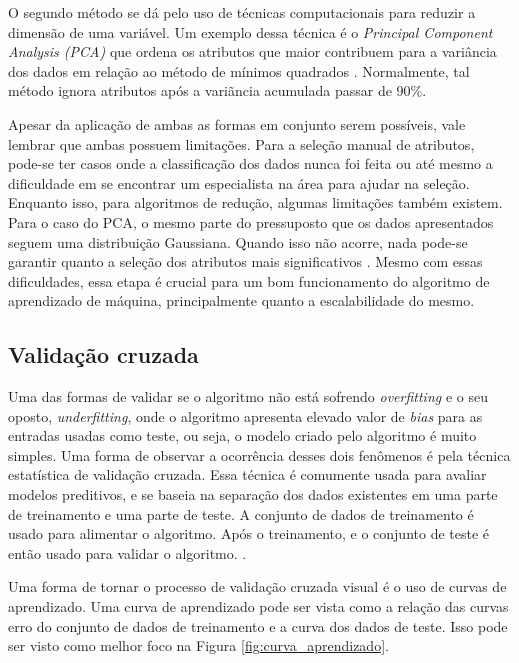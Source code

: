 O segundo método se dá pelo uso de técnicas computacionais para reduzir a
dimensão de uma variável. Um exemplo dessa técnica é o \textit{Principal
Component Analysis (PCA) } que ordena os atributos que maior contribuem para a
variância dos dados em relação ao método de mínimos quadrados
\cite{amatriain2011data}. Normalmente, tal método ignora atributos após a
variãncia acumulada passar de 90\%.

Apesar da aplicação de ambas as formas em conjunto serem possíveis, vale lembrar
que ambas possuem limitações. Para a seleção manual de atributos, pode-se ter
casos onde a classificação dos dados nunca foi feita ou até mesmo a dificuldade
em se encontrar um especialista na área para ajudar na seleção. Enquanto isso,
para algoritmos de redução, algumas limitações também existem. Para o caso do
PCA, o mesmo parte do pressuposto que os dados apresentados seguem uma
distribuição Gaussiana. Quando isso não acorre, nada pode-se garantir quanto a
seleção dos atributos mais significativos \cite{amatriain2011data}. Mesmo com
essas dificuldades, essa etapa é crucial para um bom funcionamento do algoritmo
de aprendizado de máquina, principalmente quanto a escalabilidade do mesmo.


\subsection{Validação cruzada}

Uma das formas de validar se o algoritmo não está sofrendo \textit{overfitting}
e o seu oposto, \textit{underfitting}, onde o algoritmo apresenta elevado valor
de \textit{bias} para as entradas usadas como teste, ou seja, o modelo criado
pelo algoritmo é muito simples. Uma forma de observar a ocorrência desses dois
fenômenos é pela técnica estatística de validação cruzada. Essa técnica é
comumente usada para avaliar modelos preditivos, e se baseia na separação dos
dados existentes em uma parte de treinamento e uma parte de teste. A conjunto de
dados de treinamento é usado para alimentar o algoritmo. Após o treinamento,
e o conjunto de teste é então usado para validar o algoritmo. \cite{araujo2011apprecommender}.

Uma forma de tornar o processo de validação cruzada visual é o uso de curvas de
aprendizado. Uma curva de aprendizado pode ser vista como a relação das curvas
erro do conjunto de dados de treinamento e a curva dos dados de teste. Isso pode
ser visto como melhor foco na Figura \ref{fig:curva_aprendizado}.

